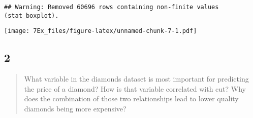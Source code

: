 \documentclass[]{article}
\newenvironment{Shaded}{\begin{snugshade}}{\end{snugshade}}
\newcommand{\DataTypeTok}[1]{\textcolor[rgb]{0.13,0.29,0.53}{#1}}
\newcommand{\DecValTok}[1]{\textcolor[rgb]{0.00,0.00,0.81}{#1}}
\newcommand{\KeywordTok}[1]{\textcolor[rgb]{0.13,0.29,0.53}{\textbf{#1}}}
\newcommand{\NormalTok}[1]{#1}
\newcommand{\OperatorTok}[1]{\textcolor[rgb]{0.81,0.36,0.00}{\textbf{#1}}}
\newcommand{\StringTok}[1]{\textcolor[rgb]{0.31,0.60,0.02}{#1}}
\begin{document}
\begin{Shaded}
\end{Shaded}

\begin{verbatim}
## Warning: Removed 60696 rows containing non-finite values (stat_boxplot).
\end{verbatim}

\texttt{[image: 7Ex\_files/figure-latex/unnamed-chunk-7-1.pdf]}

\hypertarget{section-10}{%
\subsection{2}\label{section-10}}

\begin{quote}
What variable in the diamonds dataset is most important for predicting
the price of a diamond? How is that variable correlated with cut? Why
does the combination of those two relationships lead to lower quality
diamonds being more expensive?
\end{quote}

\begin{Shaded}
\end{Shaded}
\end{document}
